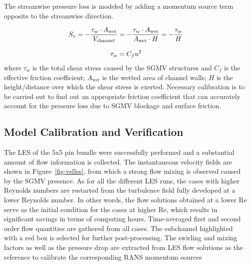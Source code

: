 The streamwise pressure loss is modeled by adding a momentum source term opposite to the streamwise direction.

\begin{equation}
  S_z = -\frac{\tau_w \cdot A_\text{wet}}{V_\text{channel}}=-\frac{\tau_w \cdot A_\text{wet}}{A_\text{wet} \cdot H}=-\frac{\tau_w}{H}\\
\end{equation}

\begin{equation}
  \tau_w = C_fu^2\\
\end{equation}
where $\tau_w$ is the total shear stress caused by the SGMV structures and
$C_f$ is the effective friction coefficient;
$A_\text{wet}$ is the wetted area of channel walls;
$H$ is the height/distance over which the shear stress is exerted.
Necessary calibration is to be carried out to find out an appropriate friction coefficient that can accurately account for the pressure loss due to SGMV blockage and surface friction.


\subsection{Model Calibration and Verification}
\label{sec:msm3}

The LES of the 5x5 pin bundle were successfully performed and a substantial amount of flow information is collected.
The instantaneous velocity fields are shown in Figure~\ref{fig:velles}, from which a strong flow mixing is observed caused by the SGMV presence.
As for all the different LES runs, the cases with higher Reynolds numbers are restarted from the turbulence field fully developed at a lower Reynolds number.
In other words, the flow solutions obtained at a lower Re serve as the initial condition for the cases at higher Re, which results in significant savings in terms of computing hours.
Time-averaged first and second order flow quantities are gathered from all cases.
The subchannel highlighted with a red box is selected for further post-processing. The swirling and mixing factors as well as the pressure drop are extracted from LES flow solutions as the reference to calibrate the corresponding RANS momentum sources

